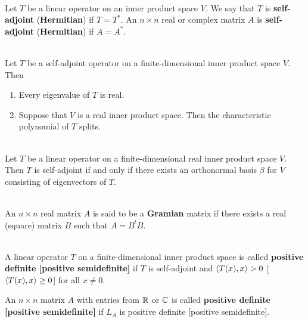 \begin{definition}
	\hfill\\
	Let $T$ be a linear operator on an inner product space $V$. We say that $T$ is \textbf{self-adjoint} (\textbf{Hermitian}) if $T = T^*$. An $n \times n$ real or complex matrix $A$ is \textbf{self-adjoint} (\textbf{Hermitian}) if $A = A^*$.
\end{definition}

\begin{lemma}
	\hfill\\
	Let $T$ be a self-adjoint operator on a finite-dimensional inner product space $V$. Then

	\begin{enumerate}
		\item Every eigenvalue of $T$ is real.
		\item Suppose that $V$ is a real inner product space. Then the characteristic polynomial of $T$ splits.
	\end{enumerate}
\end{lemma}

\begin{theorem}
	\hfill\\
	Let $T$ be a linear operator on a finite-dimensional real inner product space $V$. Then $T$ is self-adjoint if and only if there exists an orthonormal basis $\beta$ for $V$ consisting of eigenvectors of $T$.
\end{theorem}

\begin{definition}
	\hfill\\
	An $n \times n$ real matrix $A$ is said to be a \textbf{Gramian} matrix if there exists a real (square) matrix $B$ such that $A = B^tB$.
\end{definition}

\begin{definition}
	\hfill\\
	A linear operator $T$ on a finite-dimensional inner product space is called \textbf{positive definite [positive semidefinite]} if $T$ is self-adjoint and $\langle T(x),x\rangle > 0$ [$\langle T(x),x\rangle \geq 0$] for all $x \neq 0$.

	An $n \times n$ matrix $A$ with entries from $\mathbb{R}$ or $\mathbb{C}$ is called \textbf{positive definite [positive semidefinite]} if $L_A$ is positive definite [positive semidefinite].
\end{definition}
